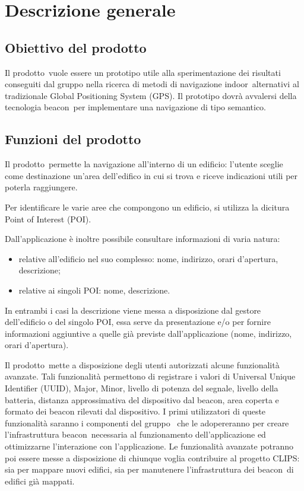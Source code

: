 \documentclass[../AnalisiDeiRequisiti.tex]{subfiles}
\begin{document}
\section{Descrizione generale}
	\subsection{Obiettivo del prodotto}
	Il prodotto\g\ vuole essere un prototipo utile alla sperimentazione dei risultati conseguiti dal gruppo nella ricerca di metodi di navigazione indoor\g\ alternativi al tradizionale Global Positioning System (GPS).
Il prototipo dovrà avvalersi della tecnologia beacon\g\ per implementare una navigazione di tipo semantico.

	\subsection{Funzioni del prodotto}
	Il prodotto\g\ permette la navigazione all’interno di un edificio: l’utente sceglie come destinazione un'area dell’edifico in cui si trova e riceve indicazioni utili per poterla raggiungere. 
	
	Per identificare le varie aree che compongono un edificio, si utilizza la dicitura Point of Interest (POI\g).
	
	Dall'applicazione è inoltre possibile consultare informazioni di varia natura:
	\begin{itemize}
		\item relative all’edificio nel suo complesso: nome, indirizzo, orari d'apertura, descrizione;
		\item relative ai singoli POI\g: nome, descrizione.
	\end{itemize}
	In entrambi i casi la descrizione viene messa a disposizione dal gestore dell'edificio o del singolo POI\g, essa serve da presentazione e/o per fornire informazioni aggiuntive a quelle già previste dall'applicazione (nome, indirizzo, orari d'apertura). 
	
	Il prodotto\g\ mette a disposizione degli utenti autorizzati alcune funzionalità avanzate. Tali funzionalità permettono di registrare  i valori di Universal Unique Identifier (UUID), Major, Minor, livello di potenza del segnale, livello della batteria, distanza approssimativa del dispositivo dal beacon\g, area coperta e formato dei beacon rilevati dal dispositivo. I primi utilizzatori di queste funzionalità saranno i componenti del gruppo \leaf\ che le adopereranno per creare l’infrastruttura beacon\g\ necessaria al funzionamento dell’applicazione ed ottimizzarne l'interazione con l'applicazione. Le funzionalità avanzate potranno poi essere messe a disposizione di chiunque voglia contribuire al progetto CLIPS: sia per mappare nuovi edifici, sia per manutenere l'infrastruttura dei beacon\g\ di edifici già mappati.
		
\end{document}
